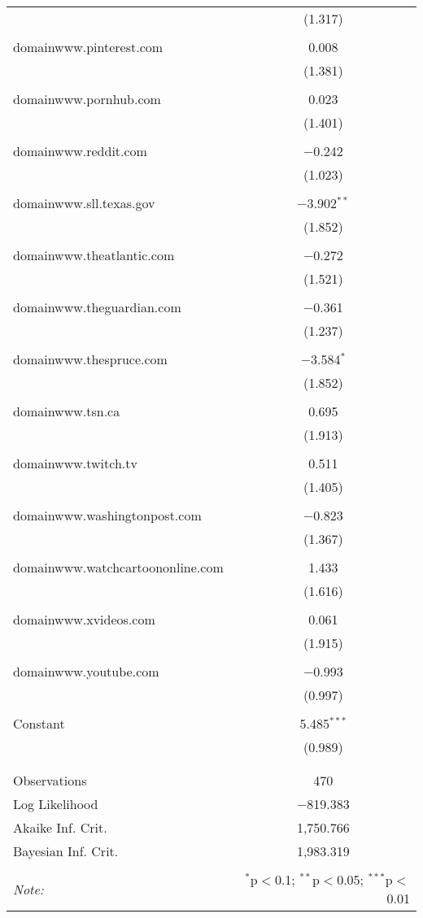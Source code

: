 \begin{table}[!htbp]
\begin{tabular}{@{\extracolsep{5pt}}lc}
  & (1.317) \\ 
  & \\ 
 domainwww.pinterest.com & 0.008 \\ 
  & (1.381) \\ 
  & \\ 
 domainwww.pornhub.com & 0.023 \\ 
  & (1.401) \\ 
  & \\ 
 domainwww.reddit.com & $-$0.242 \\ 
  & (1.023) \\ 
  & \\ 
 domainwww.sll.texas.gov & $-$3.902$^{**}$ \\ 
  & (1.852) \\ 
  & \\ 
 domainwww.theatlantic.com & $-$0.272 \\ 
  & (1.521) \\ 
  & \\ 
 domainwww.theguardian.com & $-$0.361 \\ 
  & (1.237) \\ 
  & \\ 
 domainwww.thespruce.com & $-$3.584$^{*}$ \\ 
  & (1.852) \\ 
  & \\ 
 domainwww.tsn.ca & 0.695 \\ 
  & (1.913) \\ 
  & \\ 
 domainwww.twitch.tv & 0.511 \\ 
  & (1.405) \\ 
  & \\ 
 domainwww.washingtonpost.com & $-$0.823 \\ 
  & (1.367) \\ 
  & \\ 
 domainwww.watchcartoononline.com & 1.433 \\ 
  & (1.616) \\ 
  & \\ 
 domainwww.xvideos.com & 0.061 \\ 
  & (1.915) \\ 
  & \\ 
 domainwww.youtube.com & $-$0.993 \\ 
  & (0.997) \\ 
  & \\ 
 Constant & 5.485$^{***}$ \\ 
  & (0.989) \\ 
  & \\ 
\hline \\[-1.8ex] 
Observations & 470 \\ 
Log Likelihood & $-$819.383 \\ 
Akaike Inf. Crit. & 1,750.766 \\ 
Bayesian Inf. Crit. & 1,983.319 \\ 
\hline 
\hline \\[-1.8ex] 
\textit{Note:}  & \multicolumn{1}{r}{$^{*}$p$<$0.1; $^{**}$p$<$0.05; $^{***}$p$<$0.01} \\ 
\end{tabular} 
\end{table} 